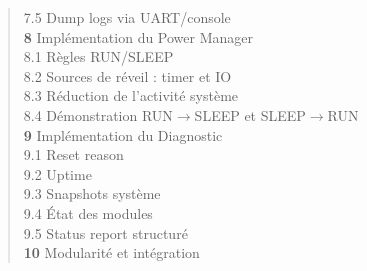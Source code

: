 \begin{quote}
\hspace{2.5em} 7.5 \hspace{0.5em} Dump logs via UART/console \dotfill \pageref{subsec:logdump}\\
\textbf{8} \hspace{1em} Implémentation du Power Manager \dotfill \pageref{sec:power_impl}\\
\hspace{2.5em} 8.1 \hspace{0.5em} Règles RUN/SLEEP \dotfill \pageref{subsec:power_rules}\\
\hspace{2.5em} 8.2 \hspace{0.5em} Sources de réveil : timer et IO \dotfill \pageref{subsec:power_wake}\\
\hspace{2.5em} 8.3 \hspace{0.5em} Réduction de l'activité système \dotfill \pageref{subsec:power_reduce}\\
\hspace{2.5em} 8.4 \hspace{0.5em} Démonstration RUN$\rightarrow$SLEEP et SLEEP$\rightarrow$RUN \dotfill \pageref{subsec:power_demo}\\
\textbf{9} \hspace{1em} Implémentation du Diagnostic \dotfill \pageref{sec:diag_impl}\\
\hspace{2.5em} 9.1 \hspace{0.5em} Reset reason \dotfill \pageref{subsec:diag_reset}\\
\hspace{2.5em} 9.2 \hspace{0.5em} Uptime \dotfill \pageref{subsec:diag_uptime}\\
\hspace{2.5em} 9.3 \hspace{0.5em} Snapshots système \dotfill \pageref{subsec:diag_snap}\\
\hspace{2.5em} 9.4 \hspace{0.5em} État des modules \dotfill \pageref{subsec:diag_mods}\\
\hspace{2.5em} 9.5 \hspace{0.5em} Status report structuré \dotfill \pageref{subsec:diag_report}\\
\textbf{10} \hspace{0.8em} Modularité et intégration \dotfill \pageref{sec:modularite}\\

\end{quote}
